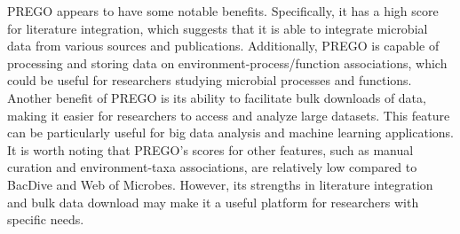 PREGO appears to have some notable benefits. Specifically, it has a high score
for literature integration, which suggests that it is able to integrate microbial
data from various sources and publications. Additionally, PREGO is capable of
processing and storing data on environment-process/function associations, which
could be useful for researchers studying microbial processes and functions.
Another benefit of PREGO is its ability to facilitate bulk downloads of data,
making it easier for researchers to access and analyze large datasets.
This feature can be particularly useful for big data analysis and machine learning applications.
It is worth noting that PREGO's scores for other features, such as manual
curation and environment-taxa associations, are relatively low compared to
BacDive and Web of Microbes. However, its strengths in literature integration
and bulk data download may make it a useful platform for researchers with specific needs.


